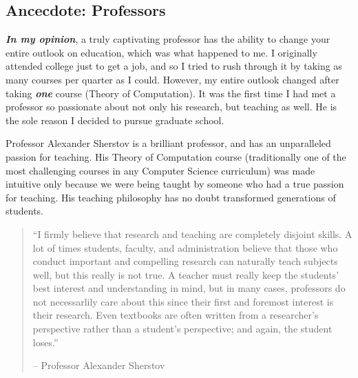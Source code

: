 \documentclass[12pt]{article}
\newcommand{\ib}[1]{\textit{\textbf{{#1}}}}
\begin{document}
\newpage
\subsection{Ancecdote: Professors}
\ib{In my opinion}, a truly captivating professor has the ability to change your
entire outlook on education, which was what happened to me. I originally
attended college just to get a job, and so I tried to rush through it by taking
as many courses per quarter as I could. However, my entire outlook changed after
taking \ib{one} course (Theory of Computation). It was the first time I had met
a professor so passionate about not only his research, but teaching as well. He
is the sole reason I decided to pursue graduate school.
\vspace{1em}

Professor Alexander Sherstov is a brilliant professor, and has an unparalleled
passion for teaching. His Theory of Computation course (traditionally one of the
most challenging courses in any Computer Science curriculum) was made intuitive
only because we were being taught by someone who had a true passion for
teaching. His teaching philosophy has no doubt transformed generations of
students.
\begin{quote}
  ``I firmly believe that research and teaching are completely disjoint
  skills. A lot of times students, faculty, and administration believe that
  those who conduct important and compelling research can naturally teach
  subjects well, but this really is not true. A teacher must really keep the
  students' best interest and understanding in mind, but in many cases,
  professors do not necessarlily care about this since their first and
  foremost interest is their research. Even textbooks are often written from a
  researcher's perspective rather than a student's perspective; and again, the
  student loses.''
  \vspace{-1em}
  \begin{flushright}
    -- Professor Alexander Sherstov
  \end{flushright}
\end{quote}

\end{document}
